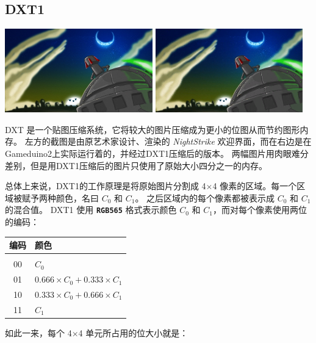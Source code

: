 \documentclass[10pt]{book}
\newcommand{\mach}[1]{\texttt{\textbf{#1}}}
\begin{document}
\begin{CJK}{UTF8}{gkai}
\newpage
\section{DXT1}
\label{dxt1}

\begin{center}
\includegraphics[width=0.48\textwidth]{assets/nightstrike/backgrounds/welcome.jpg}
\includegraphics[width=0.48\textwidth]{assets/dxt1.png}
\end{center}

DXT 是一个贴图压缩系统，它将较大的图片压缩成为更小的位图从而节约图形内存。
左方的截图是由原艺术家设计、渲染的 \textit{NightStrike} 欢迎界面，而在右边是在Gameduino2上实际运行着的，并经过DXT1压缩后的版本。
两幅图片用肉眼难分差别，但是用DXT1压缩后的图片只使用了原始大小四分之一的内存。

总体上来说，DXT1的工作原理是将原始图片分割成 4$\times$4 像素的区域。每一个区域被赋予两种颜色，名曰 $C_0$ 和 $C_1$。
之后区域内的每个像素都被表示成 $C_0$ 和 $C_1$ 的混合值。
DXT1 使用 \mach{RGB565} 格式表示颜色 $C_0$ 和 $C_1$，而对每个像素使用两位的编码：

\vspace{10pt}
\begin{tabular}{cl}
编码 & 颜色 \\
\hline \\
00 & $C_0$ \\
01 & $0.666 \times C_0 + 0.333 \times C_1$ \\
10 & $0.333 \times C_0 + 0.666 \times C_1$ \\
11 & $C_1$ \\
\end{tabular}
\vspace{10pt}

\noindent
如此一来，每个 4$\times$4 单元所占用的位大小就是：


\end{CJK}
\end{document}

